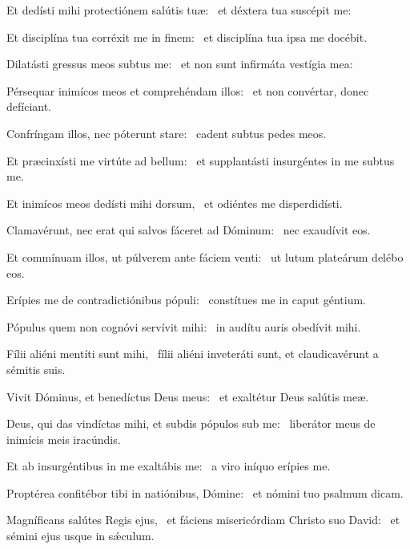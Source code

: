 
\item Et dedísti mihi protectiónem salútis tuæ:~\psstar{} et déxtera tua suscépit me:

\item Et disciplína tua corréxit me in finem:~\psstar{} et disciplína tua ipsa me docébit.

\item Dilatásti gressus meos subtus me:~\psstar{} et non sunt infirmáta vestígia mea:

\item Pérsequar inimícos meos et comprehéndam illos:~\psstar{} et non convértar, donec defíciant.

\item Confríngam illos, nec póterunt stare:~\psstar{} cadent subtus pedes meos.

\item Et præcinxísti me virtúte ad bellum:~\psstar{} et supplantásti insurgéntes in me subtus me.

\item Et inimícos meos dedísti mihi dorsum,~\psstar{} et odiéntes me disperdidísti.

\item Clamavérunt, nec erat qui salvos fáceret ad Dóminum:~\psstar{} nec exaudívit eos.

\item Et commínuam illos, ut púlverem ante fáciem venti:~\psstar{} ut lutum plateárum delébo eos.

\item Erípies me de contradictiónibus pópuli:~\psstar{} constítues me in caput géntium.

\item Pópulus quem non cognóvi servívit mihi:~\psstar{} in audítu auris obedívit mihi.

\item Fílii aliéni mentíti sunt mihi,~\psstar{} fílii aliéni inveteráti sunt, et claudicavérunt a sémitis suis.

\item Vivit Dóminus, et benedíctus Deus meus:~\psstar{} et exaltétur Deus salútis meæ.

\item Deus, qui das vindíctas mihi, et subdis pópulos sub me:~\psstar{} liberátor meus de inimícis meis iracúndis.

\item Et ab insurgéntibus in me exaltábis me:~\psstar{} a viro iníquo erípies me.

\item Proptérea confitébor tibi in natiónibus, Dómine:~\psstar{} et nómini tuo psalmum dicam.

\item Magníficans salútes Regis ejus,~\pscross{} et fáciens misericórdiam Christo suo David:~\psstar{} et sémini ejus usque in sǽculum.